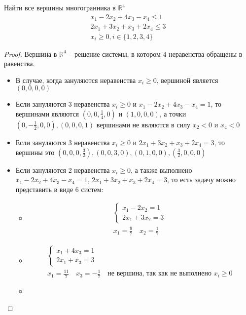 \begin{prob}
Найти все вершины многогранника в $\mathbb{R}^{4}$
\begin{gather*}
	x_{1} - 2x_{2} + 4x_{3} - x_{4} \leqslant 1 \\
	2x_{1} + 3x_{2} + x_{3} + 2x_{4} \leqslant 3 \\
	x_{i} \geqslant 0, i \in\{1,2,3,4\}
\end{gather*}
\end{prob}
\begin{proof}
	Вершина в $\mathbb{R}^4$ -- решение системы, в котором 4 неравенства обращены в равенства.
	\begin{itemize}
	\item
		В случае, когда зануляются неравенства $x_{i} \geqslant 0$, вершиной является $(0,0,0,0)$
	\item
		Если зануляются 3 неравенства $x_{i} \geqslant 0$ и $x_{1} - 2x_{2} + 4x_{3} - x_{4} = 1$, то вершинами являются $(0,0, \frac{1}{4}, 0)$ и $(1,0,0,0)$, а точки $(0,-\frac{1}{2},0,0), (0,0,0,1)$ вершинами не являются в силу $x_{2} < 0$ и $x_{4} < 0$
	\item
		Если зануляются 3 неравенства $x_{i} \geqslant 0$ и $2x_{1} + 3x_{2} + x_{3} + 2x_{4} = 3$, то вершины это $(0,0,0,\frac{3}{2}), (0,0,3,0), (0,1,0,0), (\frac{3}{2},0,0,0)$
	\item
		Если зануляются 2 неравенства $x_{i} \geqslant 0$, а также выполнено $x_{1} - 2x_{2} + 4x_{3} - x_{4} = 1$, $2x_{1} + 3x_{2} + x_{3} + 2x_{4} = 3$, то есть задачу можно представить в виде 6 систем:
	\begin{itemize}
	\item
		\begin{gather*}
		\begin{cases}
			x_1 - 2x_2 = 1\\
			2x_1 + 3x_2 = 3
		\end{cases}\\
		x_1 = \frac{9}{7}\quad
		x_2 = \frac{1}{7}
		\end{gather*}
	\item
		\begin{gather*}
		\begin{cases}
			x_1 + 4x_3 = 1\\
			2x_1 + x_3 = 3
		\end{cases}\\
		x_1 = \frac{11}{7}\quad
		x_3 = -\frac{1}{7}\quad \text{не вершина, так как не выполнено } x_i \geqslant 0
		\end{gather*}
	\item

\end{itemize}
\end{itemize}
\end{proof}
